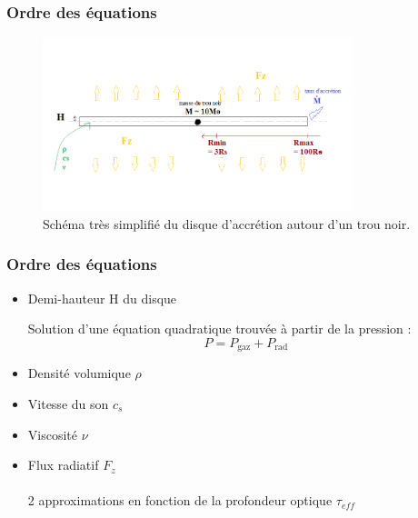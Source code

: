 
\begin{frame}
\frametitle{Ordre des équations}
      
   \begin{figure}[htb!]
      \includegraphics[width=9cm]{figures/bob_ross.png}
      \caption{Schéma très simplifié du disque d'accrétion autour d'un trou noir.}
   \end{figure}      
      \end{frame}

\begin{frame}
\frametitle{Ordre des équations}
         \begin{itemize}
      \item Demi-hauteur H du disque

      Solution d'une équation quadratique trouvée à partir de la pression :
      \begin{equation}
         P = P_\mathrm{gaz} + P_\mathrm{rad}
      \end{equation}
      \item Densité volumique $\rho$
      \item Vitesse du son $c_s$ 
      \item Viscosité $\nu$ 
      \item Flux radiatif $F_z$
      \\~\\
      2 approximations en fonction de la profondeur optique $\tau_{eff}$
   \end{itemize}
\end{frame}



